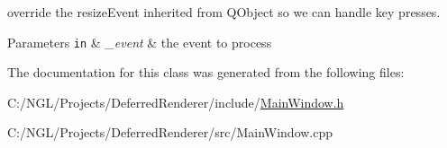 override the resize\-Event inherited from Q\-Object so we can handle key presses. 


\begin{DoxyParams}[1]{Parameters}
\mbox{\tt in}  & {\em \-\_\-event} & the event to process \\
\hline
\end{DoxyParams}


The documentation for this class was generated from the following files\-:\begin{DoxyCompactItemize}
\item 
C\-:/\-N\-G\-L/\-Projects/\-Deferred\-Renderer/include/\hyperlink{_main_window_8h}{Main\-Window.\-h}\item 
C\-:/\-N\-G\-L/\-Projects/\-Deferred\-Renderer/src/Main\-Window.\-cpp\end{DoxyCompactItemize}
